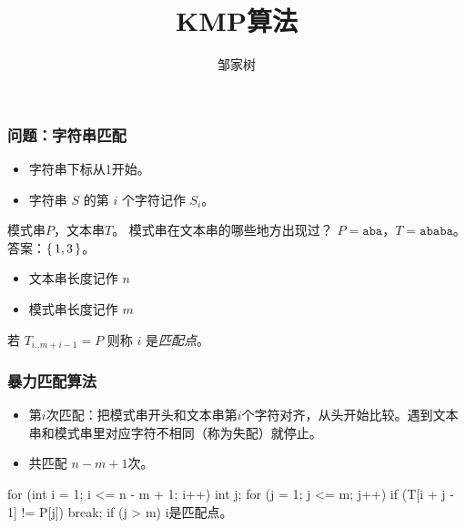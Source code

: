 \documentclass{ctexbeamer}
\newcommand{\str}[1]{\texttt{#1}}
\begin{document}
\title{KMP算法}
\author{邹家树}
\maketitle

\begin{frame}[fragile]
	\frametitle{问题：字符串匹配}

\begin{itemize}
\item 字符串下标从1开始。
\item 字符串 $S$ 的第 $i$ 个字符记作 $S_i$。
\end{itemize}

    模式串$P$，文本串$T$。
    模式串在文本串的哪些地方出现过？
    $P=\str{aba}$，$T=\str{ababa}$。答案：$\set{1, 3}$。

\begin{itemize}
\item 文本串长度记作 $n$
\item 模式串长度记作 $m$
\end{itemize}

若 $T_{i..m+i-1} = P$ 则称 $i$ 是\emph{匹配点}。

\end{frame}


\begin{frame}[fragile]
\frametitle{暴力匹配算法}

\begin{itemize}
\item 第$i$次匹配：把模式串开头和文本串第$i$个字符对齐，从头开始比较。遇到文本串和模式串里对应字符不相同（称为失配）就停止。
\item 共匹配 $n-m+1$次。
\end{itemize}


\begin{cverb}
for (int i = 1; i <= n - m + 1; i++) {
  int j;
  for (j = 1; j <= m; j++)
    if (T[i + j - 1] != P[j]) break;
  if (j > m)
    i是匹配点。
}
\end{cverb}

\end{frame}
\end{document}
